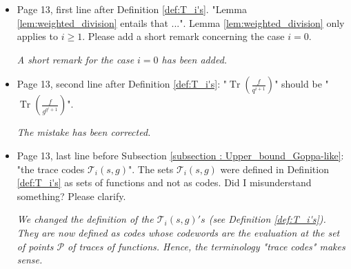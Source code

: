 \documentclass[12pt,a4paper]{amsart}
\DeclareMathOperator{\trace}{Tr}
\newcommand{\Tr}[1]{\trace\!\left(#1\right)}
\begin{document}
\begin{itemize}
\item Page 13, first line after Definition \ref{def:T_i's}. "Lemma \ref{lem:weighted_division} entails that ...". Lemma \ref{lem:weighted_division} only applies to $i \ge 1$. Please add a short remark concerning the case $i=0$.

\textit{A short remark for the case $i=0$ has been added.} 

\item Page 13, second line after Definition \ref{def:T_i's}: "$\Tr{\frac{f}{q^{i+1}}}$" should be "$\Tr{\frac{f}{g^{q^i+1}}}$".

\textit{The mistake has been corrected.}

\item Page 13, last line before Subsection \ref{subsection : Upper_bound_Goppa-like}: "the trace codes $\mathcal{T}_i(s,g)$". The sets $\mathcal{T}_i(s,g)$ were defined in Definition \ref{def:T_i's} as sets of functions and not as codes. Did I misunderstand something? Please clarify.

\textit{We changed the definition of the $\mathcal{T}_i(s,g)'s$ (see Definition \ref{def:T_i's}). They are now defined as codes whose codewords are the evaluation at the set of points $\mathcal{P}$ of traces of functions. Hence, the terminology "trace codes" makes sense.}

\end{itemize}
\end{document}
